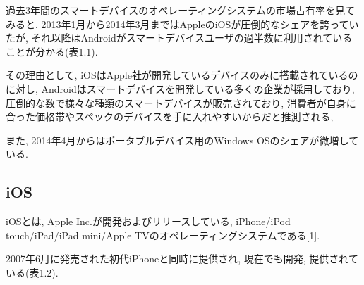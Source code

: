 過去3年間のスマートデバイスのオペレーティングシステムの市場占有率を見てみると, 2013年1月から2014年3月まではAppleのiOSが圧倒的なシェアを誇っていたが, それ以降はAndroidがスマートデバイスユーザの過半数に利用されていることが分かる(表1.1).

その理由として, iOSはApple社が開発しているデバイスのみに搭載されているのに対し, Androidはスマートデバイスを開発している多くの企業が採用しており, 圧倒的な数で様々な種類のスマートデバイスが販売されており, 消費者が自身に合った価格帯やスペックのデバイスを手に入れやすいからだと推測される,

また, 2014年4月からはポータブルデバイス用のWindows OSのシェアが微増している.

\subsection{iOS}
iOSとは, Apple Inc.が開発およびリリースしている, iPhone/iPod touch/iPad/iPad mini/Apple TVのオペレーティングシステムである[1].

2007年6月に発売された初代iPhoneと同時に提供され, 現在でも開発, 提供されている(表1.2).

